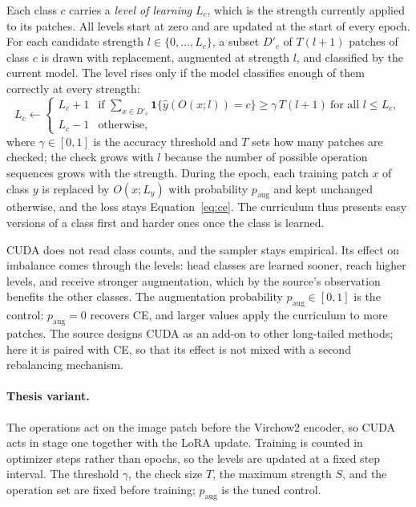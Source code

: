 \documentclass[11pt]{article}
\begin{document}
Each class $c$ carries a \emph{level of learning} $L_c$, which is the strength currently applied to its patches. All levels start at zero and are updated at the start of every epoch. For each candidate strength $l\in\{0,\ldots,L_c\}$, a subset $D'_c$ of $T(l+1)$ patches of class $c$ is drawn with replacement, augmented at strength $l$, and classified by the current model. The level rises only if the model classifies enough of them correctly at every strength:
\begin{equation}
  L_c\leftarrow
  \begin{cases}
    L_c+1 & \text{if } \sum_{x\in D'_c}\mathbf 1\bigl\{\hat y(O(x;l))=c\bigr\}\geq\gamma\,T(l+1)\ \text{for all } l\leq L_c,\\
    L_c-1 & \text{otherwise},
  \end{cases}
  \label{eq:cuda-lol}
\end{equation}
\noindent where $\gamma\in[0,1]$ is the accuracy threshold and $T$ sets how many patches are checked; the check grows with $l$ because the number of possible operation sequences grows with the strength. During the epoch, each training patch $x$ of class $y$ is replaced by $O(x;L_y)$ with probability $p_{\mathrm{aug}}$ and kept unchanged otherwise, and the loss stays Equation~\eqref{eq:ce}. The curriculum thus presents easy versions of a class first and harder ones once the class is learned.

CUDA does not read class counts, and the sampler stays empirical. Its effect on imbalance comes through the levels: head classes are learned sooner, reach higher levels, and receive stronger augmentation, which by the source's observation benefits the other classes. The augmentation probability $p_{\mathrm{aug}}\in[0,1]$ is the control: $p_{\mathrm{aug}}=0$ recovers CE, and larger values apply the curriculum to more patches. The source designs CUDA as an add-on to other long-tailed methods; here it is paired with CE, so that its effect is not mixed with a second rebalancing mechanism.

\paragraph{Thesis variant.}
The operations act on the image patch before the Virchow2 encoder, so CUDA acts in stage one together with the LoRA update. Training is counted in optimizer steps rather than epochs, so the levels are updated at a fixed step interval. The threshold $\gamma$, the check size $T$, the maximum strength $S$, and the operation set are fixed before training; $p_{\mathrm{aug}}$ is the tuned control.
\end{document}
